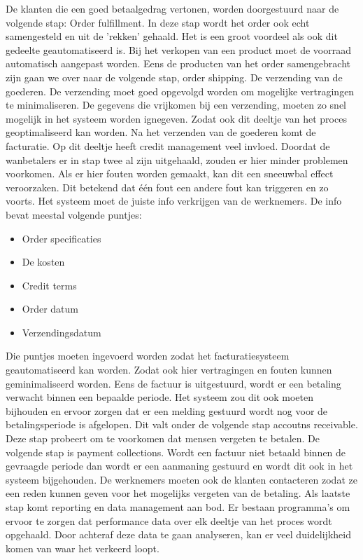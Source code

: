 De klanten die een goed betaalgedrag vertonen, worden doorgestuurd naar de volgende stap: Order fulfillment. In deze stap wordt het order ook echt samengesteld en uit de 'rekken' gehaald. Het is een groot voordeel als ook dit gedeelte geautomatiseerd is. Bij het verkopen van een product moet de voorraad automatisch aangepast worden. Eens de producten van het order samengebracht zijn gaan we over naar de volgende stap, order shipping. De verzending van de goederen. De verzending moet goed opgevolgd worden om mogelijke vertragingen te minimaliseren. De gegevens die vrijkomen bij een verzending, moeten zo snel mogelijk in het systeem worden ignegeven. Zodat ook dit deeltje van het proces geoptimaliseerd kan worden. 
Na het verzenden van de goederen komt de facturatie. Op dit deeltje heeft credit management veel invloed. Doordat de wanbetalers er in stap twee al zijn uitgehaald, zouden er hier minder problemen voorkomen. Als er hier fouten worden gemaakt, kan dit een sneeuwbal effect veroorzaken. Dit betekend dat één fout een andere fout kan triggeren en zo voorts. Het systeem moet de juiste info verkrijgen van de werknemers. De info bevat meestal volgende puntjes:
\begin{itemize}
	\item Order specificaties
	\item De kosten
	\item Credit terms
	\item Order datum
	\item Verzendingsdatum
\end{itemize}
Die puntjes moeten ingevoerd worden zodat het facturatiesysteem geautomatiseerd kan worden. Zodat ook hier vertragingen en fouten kunnen geminimaliseerd worden. Eens de factuur is uitgestuurd, wordt er een betaling verwacht binnen een bepaalde periode. Het systeem zou dit ook moeten bijhouden en ervoor zorgen dat er een melding gestuurd wordt nog voor de betalingsperiode is afgelopen. Dit valt onder de volgende stap accoutns receivable. Deze stap probeert om te voorkomen dat mensen vergeten te betalen. 
De volgende stap is payment collections. Wordt een factuur niet betaald binnen de gevraagde periode dan wordt er een aanmaning gestuurd en wordt dit ook in het systeem bijgehouden. De werknemers moeten ook de klanten contacteren zodat ze een reden kunnen geven voor het mogelijks vergeten van de betaling. 
Als laatste stap komt reporting en data management aan bod. Er bestaan programma's om ervoor te zorgen dat performance data over elk deeltje van het proces wordt opgehaald. Door achteraf deze data te gaan analyseren, kan er veel duidelijkheid komen van waar het verkeerd loopt. 
